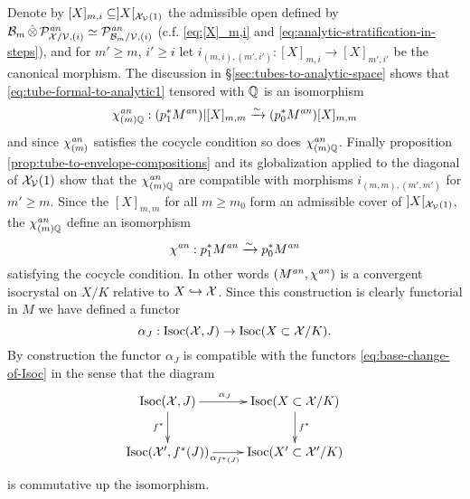 \documentclass{article}
\theoremstyle{change}
\numberwithin{equation}{subsubsection}
\begin{document}
Denote by $[X]_{m,i}\subseteq]X[_{{\cal X}_{\cal V}(1)}$ the admissible open defined
by ${\cal B}_m\mathop{\hat\otimes}{\cal P}^{\mathit{an}}_{{\cal X}/{\cal V},(i)}\simeq{\cal P}^{\mathit{an}}_{{\cal B}_m/{\cal V},(i)}$
(c.f. \ref{eq:[X]_m,i} and \ref{eq:analytic-stratification-in-steps}),
and for $m'\ge m$, $i'\ge i$ let
$i_{(m,i),(m',i')}:[X]_{m,i}\to[X]_{m',i'}$ be the canonical
morphism. The discussion in \S\ref{sec:tubes-to-analytic-space} shows
that \ref{eq:tube-formal-to-analytic1} tensored with ${\mathbb Q}$ is an
isomorphism
\begin{equation}
  \label{eq:tube-formal-to-analytic2}
  \chi^{\mathit{an}}_{(m){\mathbb Q}}:(p_1^*M^{\mathit{an}})|[X]_{m,m}\xrightarrow{\sim}(p_0^*M^{\mathit{an}})[X]_{m,m}
\end{equation}
and since $\chi^{\mathit{an}}_{(m)}$ satisfies the cocycle condition so does
$\chi^{\mathit{an}}_{(m){\mathbb Q}}$. Finally proposition
\ref{prop:tube-to-envelope-compositions} and its globalization applied
to the diagonal of ${\cal X}_{\cal V}(1)$ show that the $\chi^{\mathit{an}}_{(m){\mathbb Q}}$ are
compatible with morphisms $i_{(m,m),(m',m')}$ for $m'\ge m$. Since the
$[X]_{m,m}$ for all $m\ge m_0$ form an admissible cover of
$]X[_{{\cal X}_{\cal V}(1)}$, the $\chi^{\mathit{an}}_{(m){\mathbb Q}}$ define an isomorphism
\begin{equation}
  \label{eq:tube-formal-and-analytic3}
  \chi^{\mathit{an}}:p_1^*M^{\mathit{an}}\xrightarrow{\sim} p_0^*M^{\mathit{an}}
\end{equation}
satisfying the cocycle condition. In other words $(M^{\mathit{an}},\chi^{\mathit{an}})$ is
a convergent isocrystal on $X/K$ relative to $X\hookrightarrow{\cal X}$. Since this
construction is clearly functorial in $M$ we have defined a functor
\begin{equation}
  \label{eq:formal-to-analytic}
  \alpha_J:\mathrm{Isoc}({\cal X},J)\to\mathrm{Isoc}(X\subset{\cal X}/K).
\end{equation}
%
%
By construction the functor $\alpha_J$ is compatible with the
functors \ref{eq:base-change-of-Isoc} in the sense that the diagram
\begin{equation}
  \label{eq:alpha_J-compatibility}
  \xymatrix{
    \Isoc(\cX,J)\ar[r]^{\alpha_J\quad}\ar[d]_{f^*}
    &\Isoc(X\subset\cX/K)\ar[d]^{f^*}\\
    \Isoc(\cX',f^*(J))\ar[r]_{\alpha_{f^*(J)}\quad}&\Isoc(X'\subset\cX'/K)
  }  
\end{equation}
is commutative up the isomorphism.
\end{document}
